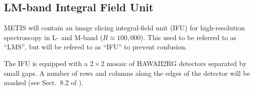 

\subsection{LM-band Integral Field Unit}
\label{ssec:instrument_data_IFU}

METIS will contain an image slicing integral-field unit (IFU) for
high-resolution spectroscopy in L- and M-band ($R\approx
100,000$).
This used to be referred to as ``\ac{LMS}'', but will be refered to as ``\ac{IFU}'' to prevent confusion.

The IFU is equipped with a $2\times2$ mosaic of HAWAII2RG detectors
separated by small gaps. A number of rows and columns along the edges
of the detector will be masked (see Sect.~8.2 of \cite{DRLS}).

